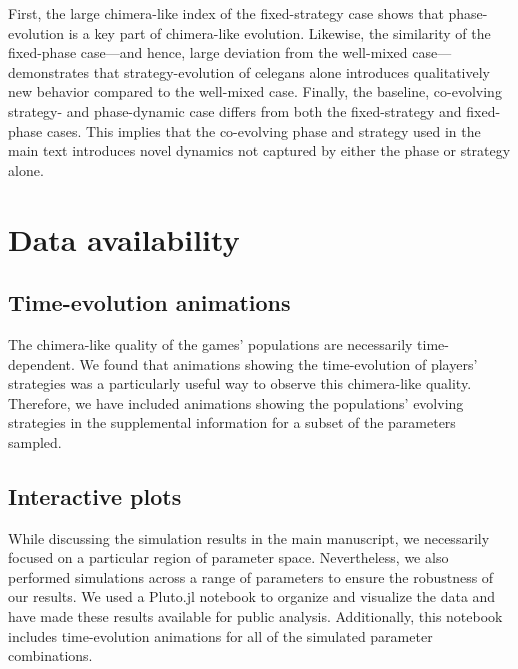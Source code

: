 \documentclass[10pt,letterpaper]{article}
\begin{document}
First, the  large chimera-like index
of the fixed-strategy case shows that phase-evolution is a key part of
chimera-like evolution.
Likewise, the  similarity of the
fixed-phase case---and hence, large deviation from the well-mixed
case---demonstrates that strategy-evolution of \gls{celegans} alone
introduces qualitatively new
behavior compared to the well-mixed case.
Finally, the baseline, co-evolving strategy- and phase-dynamic case
differs from both the  fixed-strategy
and  fixed-phase cases.
This implies that the co-evolving phase and strategy used in the main
text
introduces novel dynamics not captured by either the phase or strategy
alone.

\section{Data availability}
\subsection{Time-evolution animations}
The chimera-like quality of the games' populations
are necessarily time-dependent.
We found that animations showing the time-evolution
of players' strategies was a particularly useful way
to observe this chimera-like quality.
Therefore, we have included animations
showing the populations' evolving strategies
in the supplemental information for a subset of the parameters sampled.

\subsection{Interactive plots}
While discussing the simulation results in the main manuscript,
we necessarily focused on a particular region of parameter space.
Nevertheless, we also performed simulations across a range of parameters
to ensure the robustness of our results.
We used a Pluto.jl notebook to organize and visualize the data
and have made these results available for public analysis.
Additionally, this notebook includes time-evolution animations
for all of the simulated parameter combinations.


\end{document}
